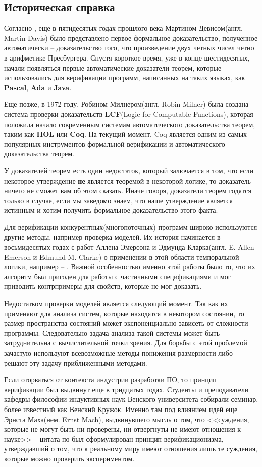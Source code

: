 \subsection{Историческая справка}

Согласно \cite{omodeo2017martin}, еще в пятидесятых годах прошлого века Мартином Девисом(англ. Martin Davis) было представлено первое формальное доказательство, полученное автоматически -- доказательство того, что произведение двух четных чисел четно в арифметике Пресбургера. Спустя короткое время, уже в конце шестидесятых, начали появляться первые автоматические доказатели теорем, которые использовались для верификации программ, написанных на таких языках, как \textbf{Pascal}, \textbf{Ada} и \textbf{Java}.

Еще позже, в 1972 году, Робином Милнером(англ. Robin Milner) была создана система проверки доказательств \textbf{LCF}(Logic for Computable Functions), которая положила начало современным системам автоматического доказательства теорем, таким как \textbf{HOL} или \textbf{Coq}. На текущий момент, Coq является одним из самых популярных инструментов формальной верификации и автоматического доказательства теорем.

У доказателей теорем есть один недостаток, который залючается в том, что если некоторое утверждение \textbf{не} является теоремой в некоторой логике, то доказатель ничего не сможет вам об этом сказать. Иначе говоря, доказатели теорем годятся только в случае, если мы заведомо знаем, что наше утверждение является истинным и хотим получить формальное доказательство этого факта.

Для верификации конкурентных(многопоточных) программ широко используются другие методы, например проверка моделей. Их история начинается в восьмидесятых годах с работ Аллена Эмерсона и Эдмунда Кларка(англ. E. Allen Emerson и Edmund M. Clarke) о применении в этой области темпоральной логики, например -- \cite{Clarke:1981:DSS:648063.747438}. Важной особенностью именно этой работы было то, что их алгоритм был пригоден для работы с частичными спецификациями и мог приводить контрпримеры для свойств, которые не мог доказать.

Недостатком проверки моделей является следующий момент. Так как их применяют для анализа систем, которые находятся в некотором состоянии, то размер пространства состояний может экспоненциально зависеть от сложности программы. Следовательно задача анализа такой системы может быть затруднительна с вычислительной точки зрения. Для борьбы с этой проблемой зачастую используют всевозможные методы понижения размерности либо решают эту задачу приближенными методами. 

Если оторваться от контекста индустрии разработки ПО, то принцип верификации был выдвинут еще в тридцатых годах. Студенты и преподаватели кафедры философии индуктивных наук Венского университета собирали семинар, более известный как Венский Кружок. Именно там под влиянием идей еще Эрнста Маха(нем. Ernst Mach), выдвинувшего мысль о том, что <<суждения, которые не могут быть ни проверены, ни отвергнуты не имеют отношения к науке>> -- цитата по \cite{wiki:mach} был сформулирован принцип верификационизма, утверждавший о том, что к реальному миру имеют отношения лишь те суждения, которые можно проверить экспериментом.
